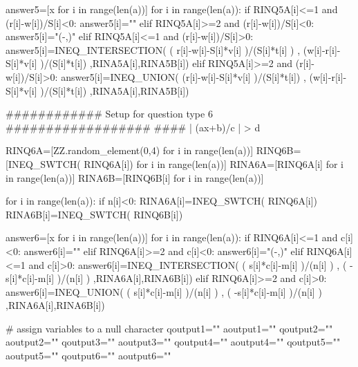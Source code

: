 \documentclass{article}%
\begin{document}
\begin{sagesilent}
answer5=[x for i in range(len(a))]
for i in range(len(a)):
  if RINQ5A[i]<=1 and (r[i]-w[i])/S[i]<0:
    answer5[i]="\emptyset"
  elif RINQ5A[i]>=2 and (r[i]-w[i])/S[i]<0:
    answer5[i]="(-\infty,\infty)"
  elif RINQ5A[i]<=1 and (r[i]-w[i])/S[i]>0: 
    answer5[i]=INEQ_INTERSECTION(  ( r[i]-w[i]-S[i]*v[i] )/(S[i]*t[i] )   ,  (w[i]-r[i]-S[i]*v[i] )/(S[i]*t[i])  ,RINA5A[i],RINA5B[i])
  elif RINQ5A[i]>=2 and (r[i]-w[i])/S[i]>0: 
    answer5[i]=INEQ_UNION( (r[i]-w[i]-S[i]*v[i] )/(S[i]*t[i])  ,  (w[i]-r[i]-S[i]*v[i] )/(S[i]*t[i])  ,RINA5A[i],RINA5B[i])     
   
   
   
   
############ Setup for question type 6 ##################
####        | (ax+b)/c | > d

RINQ6A=[ZZ.random_element(0,4) for i in range(len(a))]
RINQ6B=[INEQ_SWTCH( RINQ6A[i]) for i in range(len(a))]
RINA6A=[RINQ6A[i] for i in range(len(a))]
RINA6B=[RINQ6B[i] for i in range(len(a))]


for i in range(len(a)):
  if n[i]<0:
    RINA6A[i]=INEQ_SWTCH( RINQ6A[i])
    RINA6B[i]=INEQ_SWTCH( RINQ6B[i])
    
answer6=[x for i in range(len(a))]
for i in range(len(a)):
  if RINQ6A[i]<=1 and c[i]<0:
    answer6[i]="\emptyset"
  elif RINQ6A[i]>=2 and c[i]<0:
    answer6[i]="(-\infty,\infty)"
  elif RINQ6A[i]<=1 and c[i]>0: 
    answer6[i]=INEQ_INTERSECTION(  ( s[i]*c[i]-m[i] )/(n[i] )   ,  ( -s[i]*c[i]-m[i] )/(n[i] )  ,RINA6A[i],RINA6B[i])
  elif RINQ6A[i]>=2 and c[i]>0: 
    answer6[i]=INEQ_UNION( ( s[i]*c[i]-m[i] )/(n[i] )  ,  ( -s[i]*c[i]-m[i] )/(n[i] )  ,RINA6A[i],RINA6B[i])     
    
    
    
# assign variables to a null character
qoutput1=""
aoutput1=""
qoutput2=""
aoutput2=""
qoutput3=""
aoutput3=""
qoutput4=""
aoutput4=""
qoutput5=""
aoutput5=""
qoutput6=""
aoutput6=""


\end{sagesilent}
\end{document}
